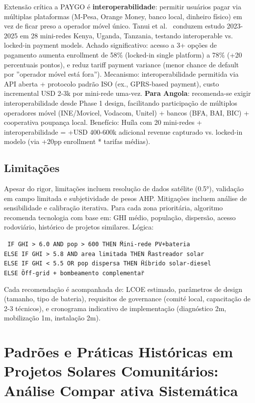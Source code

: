 \documentclass[12pt, a4paper]{article}
\begin{document}
Extensão crítica a PAYGO é
\textbf{interoperabilidade}: permitir usuários pagar via múltiplas plataformas (M-Pesa, Orange Money, banco local, dinheiro físico) em vez de ficar preso a operador móvel único. Tanui et al.~\citep{Tanui2024} conduzem estudo 2023-2025 em 28 mini-redes Kenya, Uganda, Tanzania, testando interoperable vs. locked-in payment models. Achado significativo: acesso a 3+ opções de pagamento aumenta enrollment de 58\% (locked-in single platform) a 78\% (+20 percentuais pontos), e reduz tariff payment variance (menor chance de default por ''operador móvel está fora''). Mecanismo: interoperabilidade permitida via API aberta + protocolo padrão ISO (ex., GPRS-based payment), custo incremental USD 2-3k por mini-rede uma-vez. 
\textbf{Para Angola}: recomenda-se exigir interoperabilidade desde Phase 1 design, facilitando participação de múltiplos operadores móvel (INE/Movicel, Vodacom, Unitel) + bancos (BFA, BAI, BIC) + cooperativa poupança local. Benefício: Huíla com 20 mini-redes + interoperabilidade = +USD 400-600k adicional revenue capturado vs. locked-in modelo (via +20pp enrollment * tarifas médias).

\subsection{Limitações}

Apesar do rigor, limitações incluem resolução de dados satélite (0.5°), validação em campo limitada e subjetividade de pesos AHP. Mitigações incluem análise de sensibilidade e calibração iterativa.
Para cada zona prioritária, algoritmo recomenda tecnologia com base em: GHI médio, população, dispersão, acesso rodoviário, histórico de projetos similares. Lógica:

\texttt{
IF GHI > 6.0 AND pop > 600 THEN \"Mini-rede PV+bateria\" \\
ELSE IF GHI > 5.8 AND area limitada THEN \"Rastreador solar\" \\
ELSE IF GHI < 5.5 OR pop dispersa THEN \"Híbrido solar-diesel\" \\
ELSE \"Off-grid + bombeamento complementar\"
}

Cada recomendação é acompanhada de: LCOE estimado, parâmetros de design (tamanho, tipo de bateria), requisitos de governance (comité local, capacitação de 2-3 técnicos), e cronograma indicativo de implementação (diagnóstico 2m, mobilização 1m, instalação 2m).

\section{Padrões e Práticas Históricas em Projetos Solares Comunitários: Análise Compar ativa Sistemática}
\end{document}
